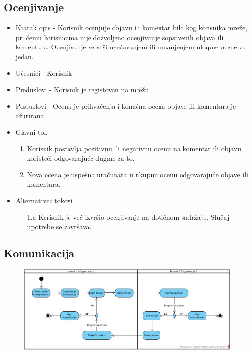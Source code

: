 \subsection{Ocenjivanje}
\begin{itemize}
	\item Kratak opis - Korisnik ocenjuje objavu ili komentar bilo kog korisnika mreže, pri čemu korisnicima nije dozvoljeno ocenjivanje sopstvenih objava ili komentara. Ocenjivanje se vrši uvećavanjem ili umanjenjem ukupne ocene za jedan.
	\item Učesnici - Korisnik
	\item Preduslovi - Korisnik je registovan na mrežu
	\item Postuslovi - Ocena je prihvaćenja i konačna ocena objave ili komentara je ažurirana.
	\item Glavni tok
	\begin{enumerate}
		\item Korisnik postavlja pozitivnu ili negativnu ocenu na komentar ili objavu koristeći odgovarajuće dugme za to.
		\item Nova ocena je uspešno uračunata u ukupnu ocenu odgovarajuće objave ili komentara.
	\end{enumerate}
	\item Alternativni tokovi
    \begin{itemize}
		\item[1.a] Korisnik je već izvršio ocenjivanje na dotičnom sadržaju. Slučaj upotrebe se završava.
	\end{itemize}
\end{itemize}

\subsection{Komunikacija}

\begin{figure}[h!]
		\centerline{\includegraphics[width=\textwidth]{slike/komunikacija.jpg}}
\end{figure}

